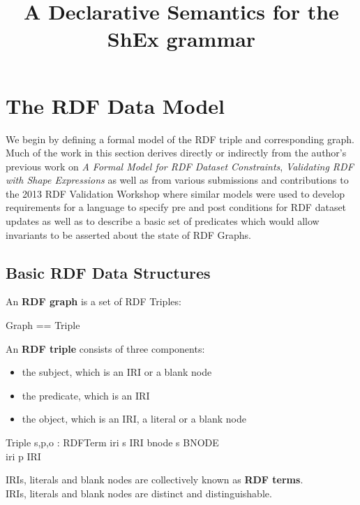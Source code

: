 \documentclass{article}
\title{A Declarative Semantics for the ShEx grammar}
\begin{document}
\maketitle
\tableofcontents
\pagebreak


\section{The RDF Data Model}
We begin by defining a formal model of the RDF triple and corresponding graph. Much of the work in this section
derives directly or indirectly from the author's previous work on
\textit{A Formal Model for RDF Dataset Constraints}\cite{jist2013},
\textit{Validating RDF with Shape Expressions}\cite{DBLP:journals/corr/BonevaGHPSS14} as well as
from various submissions and contributions to the 2013 RDF Validation
Workshop\cite{RDFVal} where similar models were used to develop  requirements for a language to specify pre and post conditions for RDF dataset updates as well as to
describe a basic set of predicates which would allow invariants to be asserted about the state of RDF Graphs.

\begin{zed}
[String]
\end{zed}

\subsection{Basic RDF Data Structures}
An \textbf{RDF graph} is a set of RDF Triples:
\begin{zed}
  Graph == \power Triple
\end{zed}

\noindent
An \textbf{RDF triple} consists of three components:
  \begin{itemize}
  \item the subject, which is an IRI or a blank node
  \item the predicate, which is an IRI
  \item the object, which is an IRI, a literal or a blank node
  \end{itemize}

\begin{schema}{Triple}
  s,p,o : RDFTerm
  \where
  iri \inv s \in IRI \lor bnode \inv s \in BNODE \\
   iri \inv p \in IRI
 \end{schema}
 
\noindent
IRIs, literals and blank nodes are collectively known as \textbf{RDF terms}.\\
IRIs, literals and blank nodes are distinct and distinguishable.
\end{document}

